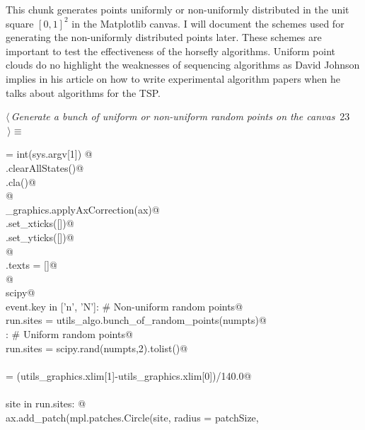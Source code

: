 \documentclass[11.5pt]{report}
\begin{document}
\newchunk This chunk generates points uniformly or non-uniformly distributed in the 
unit square $[0,1]^2$ in the Matplotlib canvas. I will document the schemes used for 
generating the non-uniformly distributed points later. These schemes are important to test the effectiveness of 
the horsefly algorithms. Uniform point clouds do no highlight the weaknesses of 
sequencing algorithms as David Johnson implies in his article on how to write 
experimental algorithm papers when he talks about algorithms for the TSP. 

\begin{flushleft} \small\label{scrap15}\raggedright\small
{} $\langle\,${\itshape Generate a bunch of uniform or non-uniform random points on the canvas}\nobreak\ {\footnotesize {23}}$\,\rangle\equiv$
\vspace{-1ex}
\begin{list}{}{} \item
\mbox{}\verb@numpts = int(sys.argv[1]) @\\
\mbox{}\verb@run.clearAllStates()@\\
\mbox{}\verb@ax.cla()@\\
\mbox{}\verb@               @\\
\mbox{}\verb@utils_graphics.applyAxCorrection(ax)@\\
\mbox{}\verb@ax.set_xticks([])@\\
\mbox{}\verb@ax.set_yticks([])@\\
\mbox{}\verb@                @\\
\mbox{}\verb@fig.texts = []@\\
\mbox{}\verb@                 @\\
\mbox{}\verb@import scipy@\\
\mbox{}\verb@if event.key in ['n', 'N']: # Non-uniform random points@\\
\mbox{}\verb@        run.sites = utils_algo.bunch_of_random_points(numpts)@\\
\mbox{}\verb@else : # Uniform random points@\\
\mbox{}\verb@        run.sites = scipy.rand(numpts,2).tolist()@\\
\mbox{}\verb@@\\
\mbox{}\verb@patchSize  = (utils_graphics.xlim[1]-utils_graphics.xlim[0])/140.0@\\
\mbox{}\verb@@\\
\mbox{}\verb@for site in run.sites:      @\\
\mbox{}\verb@    ax.add_patch(mpl.patches.Circle(site, radius = patchSize, \@\\

\end{list}
\end{flushleft}
\end{document}
